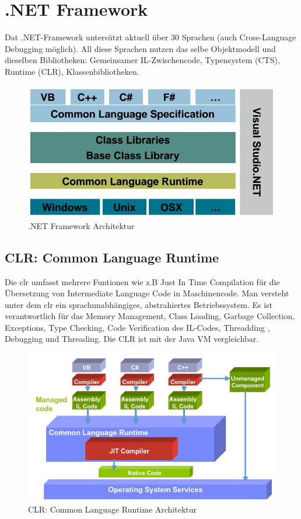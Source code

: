 \documentclass[
a4paper,
oneside,
10pt,
fleqn,
headsepline,
toc=listofnumbered, 
bibliography=totocnumbered]{scrartcl}
\let\stdsection\section
\renewcommand\section{\clearpage\stdsection}
\begin{document}
\section{.NET Framework}

Dat .NET-Framework untersützt aktuell über 30 Sprachen (auch Cross-Language Debugging möglich). All diese Sprachen nutzen das selbe Objektmodell und dieselben Bibliotheken: Gemeinsamer IL-Zwischencode,  Typensystem (CTS), Runtime (CLR), Klassenbibliotheken.
\begin{figure}[h]
\centering
\includegraphics[width=0.6\linewidth]{images/net_framework_architektur}
\caption{.NET Framework Architektur}
\label{fig:netframeworkarchitektur}
\end{figure}


\subsection{CLR: Common Language Runtime}
Die \gls{clr} umfasst mehrere Funtionen wie z.B Just In Time Compilation für die Übersetzung von Intermediate Language Code in Maschinencode. Man versteht unter dem \gls{clr} ein sprachunabhängiges, abstrahiertes Betriebssystem. Es ist verantwortlich für das Memory Management, Class Loading, Garbage Collection, Exceptions, Type Checking, Code Verification des IL-Codes, Threadding
, Debugging und Threading. Die CLR ist mit der Java VM vergleichbar.
\begin{figure}[h]
\centering
\includegraphics[width=0.6\linewidth]{images/common_language_runtime_architektur}
\caption{CLR: Common Language Runtime Architektur}
\label{fig:commonlanguageruntimearchitektur}
\end{figure}
\end{document}
